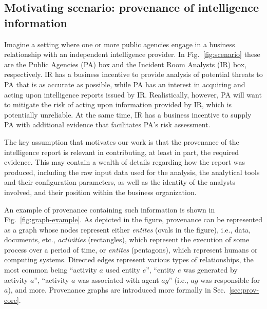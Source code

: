 \subsection{Motivating scenario: provenance of intelligence information}
%
%

Imagine a setting where one or more public agencies engage in a business relationship with an independent intelligence provider. 
%
In Fig.~\ref{fig:scenario} these are the Public Agencies (PA) box and the Incident Room Analysts (IR) box, respectively.
%
IR has a business incentive to provide analysis of potential threats to PA that is as accurate as possible, while PA has an interest in acquiring and acting upon intelligence reports issued by IR.
%
Realistically, however, PA will want to mitigate the risk of acting upon information provided by IR, which is potentially unreliable. At the same time, IR has a business incentive to supply PA with additional evidence that facilitates PA's risk assessment.
%

%
The  key assumption that motivates our work is that the provenance of the intelligence report is relevant in contributing, at least in part, the required evidence. This may contain a wealth of details regarding how the report was produced, including the raw input data used for the analysis, the analytical tools and their configuration parameters, as well as the identity of the analysts involved, and their position within the business organization.  

%
An example of provenance containing such information is shown in Fig.~\ref{fig:graph-example}.
%
As depicted in the figure, provenance can be represented as a graph whose nodes represent either \textit{entites} (ovals in the figure), i.e., data, documents, etc., \textit{activities} (rectangles), which represent the execution of some process over a period of time, or \textit{entites} (pentagons), which represent  humans or computing systems. Directed edges represent various types of relationships, the most common being ``activity $a$ used entity $e$'', ``entity $e$ was generated by activity $a$'', ``activity $a$ was associated with agent $ag$'' (i.e., $ag$ was responsible for $a$), and more.
%
Provenance graphs are introduced more formally in Sec.~\ref{sec:prov-core}.

